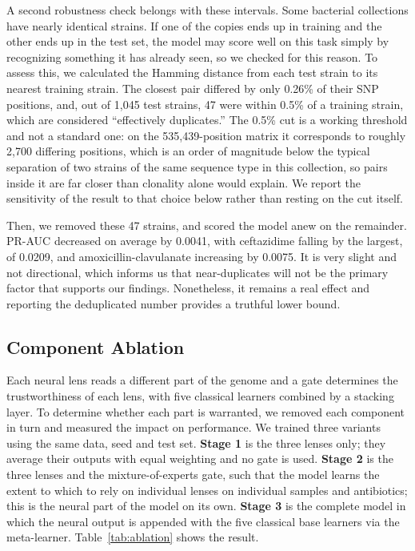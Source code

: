 \documentclass[journal]{IEEEtran}
\begin{document}
A second robustness check belongs with these intervals. Some
bacterial collections have nearly identical strains. If one of the copies ends up
in training and the other ends up in the test set, the model may score well on this
task simply by recognizing something it has already seen, so we checked for this
reason. To assess this, we calculated the Hamming distance from each test strain to
its nearest training strain. The closest pair differed by only 0.26\% of their SNP
positions, and, out of 1{,}045 test strains, 47 were within 0.5\% of a training
strain, which are considered ``effectively duplicates.'' The 0.5\% cut is a working
threshold and not a standard one: on the 535{,}439-position matrix it corresponds to
roughly 2{,}700 differing positions, which is an order of magnitude below the typical
separation of two strains of the same sequence type in this collection, so pairs
inside it are far closer than clonality alone would explain. We report the sensitivity
of the result to that choice below rather than resting on the cut itself.

Then, we removed these 47 strains, and scored the model anew on the remainder.
PR-AUC decreased on average by 0.0041, with ceftazidime falling by the largest, of
0.0209, and amoxicillin-clavulanate increasing by 0.0075. It is very slight and not
directional, which informs us that near-duplicates will not be the primary factor
that supports our findings. Nonetheless, it remains a real effect and reporting the
deduplicated number provides a truthful lower bound.

\subsection{Component Ablation}
\label{subsec:layerabl}

Each neural lens reads a different part of the genome and a gate determines the
trustworthiness of each lens, with five classical learners combined by a stacking
layer. To determine whether each part is warranted, we removed each component in turn
and measured the impact on performance. We trained three variants using the same
data, seed and test set. \textbf{Stage 1} is the three lenses only; they average
their outputs with equal weighting and no gate is used. \textbf{Stage 2} is the three
lenses and the mixture-of-experts gate, such that the model learns the extent to
which to rely on individual lenses on individual samples and antibiotics; this is the
neural part of the model on its own. \textbf{Stage 3} is the complete model in which
the neural output is appended with the five classical base learners via the
meta-learner. Table~\ref{tab:ablation} shows the result.
\end{document}
